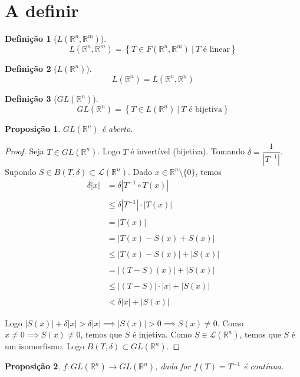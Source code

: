 \documentclass{article}
\newtheorem{prop}{Proposição}[section]
\theoremstyle{theorem}
\theoremstyle{lemma}
\theoremstyle{definition}
\newtheorem{definicao}{Definição}[section]
\theoremstyle{remark}
\begin{document}
\section{A definir}
\begin{definicao}[$L(\mathbb{R}^n, \mathbb{R}^m)$]
	$$L(\mathbb{R}^n, \mathbb{R}^m) = \left\{ T \in F(\mathbb{R}^n, \mathbb{R}^m) \: | \: T \text{ é linear}\right\}$$
\end{definicao}
\begin{definicao}[$L(\mathbb{R}^n)$]
	$$L(\mathbb{R}^n) = L(\mathbb{R}^n, \mathbb{R}^n)$$
\end{definicao}
\begin{definicao}[$GL(\mathbb{R}^n)$]
	$$GL(\mathbb{R}^n) = \left\{ T \in L(\mathbb{R}^n) \: | \: T \text{ é bijetiva}\right\}$$
\end{definicao}
\begin{prop}
	$GL(\mathbb{R}^n)$ é aberto.
\end{prop}
\begin{proof}
	Seja $T\in GL(\mathbb{R}^n)$. Logo $T$ é  invertível (bijetiva). Tomando \( \delta = \dfrac{1}{|T^{-1}|} \). Supondo \( S \in B( T, \delta) \subset \mathcal{L}( \mathbb{R}^n) \). Dado \( x\in \mathbb{R}^n \setminus \{0\} \), temos 
\begin{align*}
 \delta |x| &= \delta | T^{-1}\circ T (x)| \\~\\
&\leq \delta |T^{-1}|\cdot |T(x)| \\~\\
&= |T(x)|\\~\\
&= |T(x) - S(x) + S(x) | \\~\\
&\leq |T(x) - S(x)| + |S(x) | \\~\\
&= |(T- S)(x)| + |S(x) | \\~\\
&\leq |(T- S)|\cdot |x| + |S(x) | \\~\\
&< \delta  |x| + |S(x) | 
\end{align*}

Logo \( |S(x)| + \delta |x| >  \delta|x| \implies |S(x)| > 0 \implies S(x) \neq 0 \). Como \( x\neq 0 \implies S(x) \neq 0 \), temos que \( S\) é injetiva. Como \( S \in \mathcal{L}(\mathbb{R}^n ) \), temos que \( S\) é um isomorfismo. Logo \( B(T,\delta ) \subset GL(\mathbb{R}^n ) \).
\end{proof}
\begin{prop}
	$f:GL(\mathbb{R}^n) \to GL(\mathbb{R}^n)$, dada for $f(T) = T^{-1}$ é contínua.
\end{prop}
\end{document}
